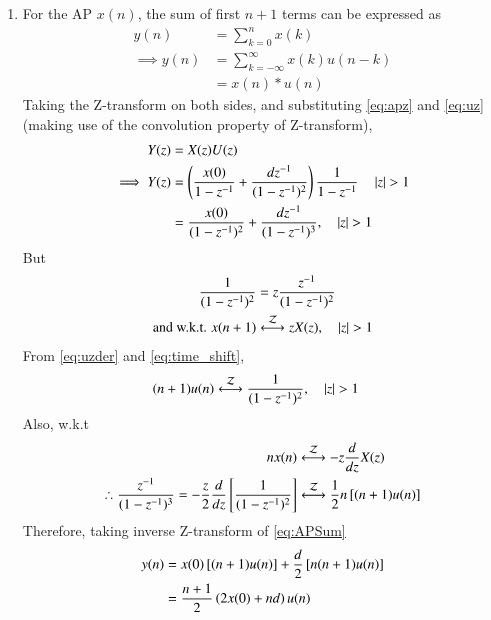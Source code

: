 \documentclass[journal,12pt,onecolumn]{IEEEtran}
\begin{document}
\begin{enumerate}
\item For the AP $x(n)$, the sum of first $n+1$ terms can be expressed as
\begin{align}
y(n) &= \sum_{k=0}^{n} x(k)\\
\implies y(n) &= \sum_{k=-\infty}^{\infty} x(k) u(n-k)\\
&= x(n) * u(n)
\end{align}
Taking the Z-transform on both sides, and substituting \eqref{eq:apz} and \eqref{eq:uz} (making use of the convolution property of Z-transform),
\begin{align}
Y(z) &= X(z) U(z)\\
\implies Y(z) &= \left(\frac{x(0)}{1-z^{-1}} + \frac{dz^{-1}}{(1-z^{-1})^{2}}\right)\frac{1}{1-z^{-1}} \quad \left\vert z\right\vert > 1 \\
&= \frac{x(0)}{({1-z^{-1}})^2} + \frac{dz^{-1}}{(1-z^{-1})^{3}}, \quad \left\vert z\right\vert > 1 \label{eq:APSum}
\end{align}
But
\begin{align}
\frac{1}{({1-z^{-1}})^2} &= z\frac{z^{-1}}{({1-z^{-1}})^2}\\
\text{and w.k.t. } x(n+1) &\overset{\mathcal{Z}}{\longleftrightarrow} zX(z), \quad \left\vert z\right\vert > 1 \label{eq:time_shift}
\end{align}
From \eqref{eq:uzder} and \eqref{eq:time_shift}, 
\begin{align}
(n+1) u(n) &\overset{\mathcal{Z}}{\longleftrightarrow} \frac{1}{({1-z^{-1}})^2}, \quad \left\vert z\right\vert > 1
\end{align}
Also, w.k.t
\begin{align}
nx(n) &\overset{\mathcal{Z}}{\longleftrightarrow} -z\frac{d}{dz}X(z)\\
\therefore \frac{z^{-1}}{(1-z^{-1})^{3}} = -\frac{z}{2}\frac{d}{dz}{}\left[\frac{1}{(1-z^{-1})^{2}}\right] &\overset{\mathcal{Z}}{\longleftrightarrow} \frac{1}{2}n{}\left[(n+1)u(n)\right]
\end{align}
Therefore, taking inverse Z-transform of \eqref{eq:APSum}
\begin{align}
y(n) &= x(0){}\left[(n + 1)u(n)\right] + \frac{d}{2}{}\left[n(n + 1)u(n)\right]\\
&= \frac{n+1}{2}\left(2x(0) + nd\right)u(n)
\end{align}
\end{enumerate}
\end{document}
